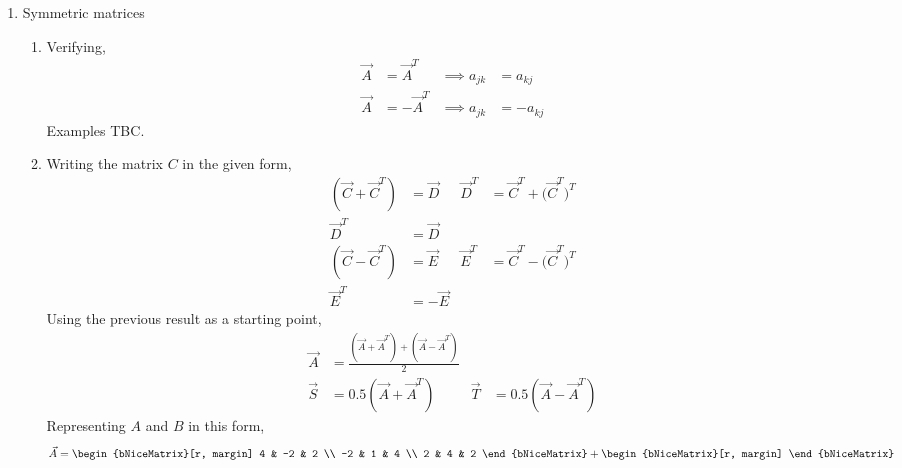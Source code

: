 \begin{enumerate}
    \item Symmetric matrices
          \begin{enumerate}
              \item Verifying,
                    \begin{align}
                        \vec{A} & = \vec{A}^T  & \implies a_{jk} & = a_{kj}  \\
                        \vec{A} & = -\vec{A}^T & \implies a_{jk} & = -a_{kj}
                    \end{align}
                    Examples TBC.
              \item Writing the matrix $ C $ in the given form,
                    \begin{align}
                        (\vec{C} + \vec{C}^T) & = \vec{D}                           &
                        \vec{D}^T             & = \vec{C}^T + \Big(\vec{C}^T\Big)^T   \\
                        \vec{D}^T             & = \vec{D}                             \\
                        (\vec{C} - \vec{C}^T) & = \vec{E}                           &
                        \vec{E}^T             & = \vec{C}^T - \Big(\vec{C}^T\Big)^T   \\
                        \vec{E}^T             & = -\vec{E}
                    \end{align}
                    Using the previous result as a starting point,
                    \begin{align}
                        \vec{A} & = \frac{(\vec{A} + \vec{A}^T)
                        + (\vec{A} - \vec{A}^T)}{2}               \\
                        \vec{S} & = 0.5(\vec{A} + \vec{A}^T)
                                & \vec{T}                       &
                        = 0.5(\vec{A} - \vec{A}^T)
                    \end{align}
                    Representing $ A $ and $ B $ in this form,
                    \begin{align}
                        \vec{A} & = \begin{bNiceMatrix}[r, margin]
                                        4 & -2 & 2 \\ -2 & 1 & 4 \\ 2 & 4 & 2
                                    \end{bNiceMatrix} +
                        \begin{bNiceMatrix}[r, margin]

\end{bNiceMatrix}
\end{align}
\end{enumerate}
\end{enumerate}
